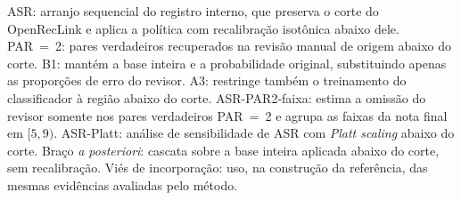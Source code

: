 \par\footnotesize ASR: arranjo sequencial do registro interno, que preserva o corte do OpenRecLink e aplica a política com recalibração isotônica abaixo dele. PAR~=~2: pares verdadeiros recuperados na revisão manual de origem abaixo do corte. B1: mantém a base inteira e a probabilidade original, substituindo apenas as proporções de erro do revisor. A3: restringe também o treinamento do classificador à região abaixo do corte. ASR-PAR2-faixa: estima a omissão do revisor somente nos pares verdadeiros PAR~=~2 e agrupa as faixas da nota final em $[5,9)$. ASR-Platt: análise de sensibilidade de ASR com \textit{Platt scaling} abaixo do corte. Braço \textit{a posteriori}: cascata sobre a base inteira aplicada abaixo do corte, sem recalibração. Viés de incorporação: uso, na construção da referência, das mesmas evidências avaliadas pelo método.

